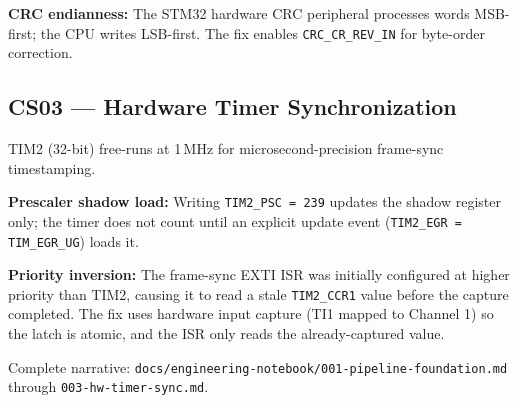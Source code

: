 \textbf{CRC endianness:} The STM32 hardware CRC peripheral processes words MSB-first; the CPU writes LSB-first. The fix enables \texttt{CRC\_CR\_REV\_IN} for byte-order correction.

\subsection{CS03 --- Hardware Timer Synchronization}

TIM2 (32-bit) free-runs at 1\,MHz for microsecond-precision frame-sync timestamping.

\textbf{Prescaler shadow load:} Writing \texttt{TIM2\_PSC = 239} updates the shadow register only; the timer does not count until an explicit update event (\texttt{TIM2\_EGR = TIM\_EGR\_UG}) loads it.

\textbf{Priority inversion:} The frame-sync EXTI ISR was initially configured at higher priority than TIM2, causing it to read a stale \texttt{TIM2\_CCR1} value before the capture completed. The fix uses hardware input capture (TI1 mapped to Channel 1) so the latch is atomic, and the ISR only reads the already-captured value.

Complete narrative: \texttt{docs/engineering-notebook/001-pipeline-foundation.md} through \texttt{003-hw-timer-sync.md}.